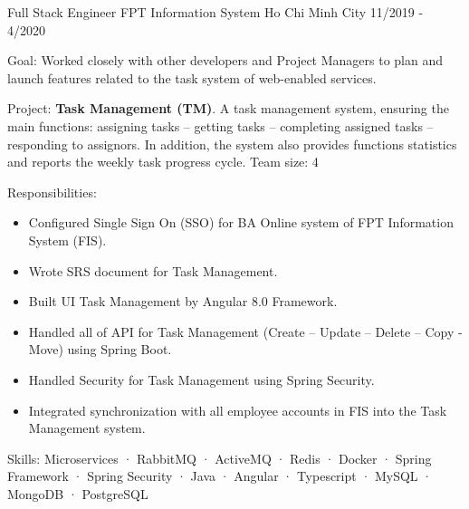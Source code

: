 \cventry
    {Full Stack Engineer} %
    {FPT Information System} %
    {Ho Chi Minh City} %
    {11/2019 - 4/2020} %
    {
      \begin{cvitems} %
        \item {Goal: Worked closely with other developers and Project Managers to plan and launch features related to the task system of web-enabled services.}
        \item {Project: \textbf{Task Management (TM)}. A task management system, ensuring the main functions: assigning tasks – getting tasks – completing assigned tasks – responding to assignors. In addition, the system also provides functions statistics and reports the weekly task progress cycle. Team size: 4}
        \item {Responsibilities: }
        {
            \begin{itemize} %
                \item {Configured Single Sign On (SSO) for BA Online system of FPT Information System (FIS).}
                \item {Wrote SRS document for Task Management.}
                \item {Built UI Task Management by Angular 8.0 Framework.}
                \item {Handled all of API for Task Management (Create – Update – Delete – Copy - Move) using Spring Boot.}
                \item {Handled Security for Task Management using Spring Security.}
                \item {Integrated synchronization with all employee accounts in FIS into the Task Management system.}
            \end{itemize}
        }
        \item {Skills: Microservices · RabbitMQ · ActiveMQ · Redis · Docker · Spring Framework · Spring Security · Java · Angular · Typescript · MySQL · MongoDB · PostgreSQL}
      \end{cvitems}
    }
